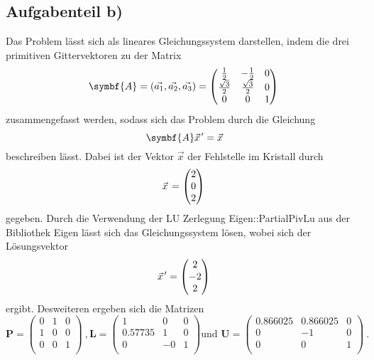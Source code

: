 \subsection*{Aufgabenteil b)}
Das Problem lässt sich als lineares Gleichungssystem darstellen, indem die drei primitiven Gittervektoren zu
der Matrix
\begin{equation}
  \symbf{A}=(\vec{a_1},\vec{a_2},\vec{a_3})=
  \begin{pmatrix}
    \frac{1}{2} & -\frac{1}{2} & 0 \\
    \frac{\sqrt{3}}{2} & \frac{\sqrt{3}}{2} & 0 \\
    0 & 0 & 1 \\
  \end{pmatrix} \\
\end{equation}
zusammengefasst werden, sodass sich das Problem durch die Gleichung
\begin{equation}
  \symbf{A}\pvec{x}'=\vec{x}
\end{equation}
beschreiben lässt.
Dabei ist der Vektor $\vec{x}$ der Fehlstelle im Kristall durch
\begin{equation*}
  \pvec{x}=
  \begin{pmatrix}
    2 \\
    0 \\
    2 \\
  \end{pmatrix} \\
\end{equation*}
gegeben.
Durch die Verwendung der LU Zerlegung Eigen::PartialPivLu aus der Bibliothek Eigen lässt sich das Gleichungssystem lösen, wobei sich der Lösungsvektor
\begin{equation*}
  \pvec{x}'=
  \begin{pmatrix}
    2 \\
    -2 \\
    2 \\
  \end{pmatrix} \\
\end{equation*}
ergibt. Desweiteren ergeben sich die Matrizen
\begin{equation*}
  \symbf{P}=
  \begin{pmatrix}
    0 & 1 & 0 \\
    1 & 0 & 0 \\
    0 & 0 & 1 \\
  \end{pmatrix} \: ,
  \symbf{L}=
  \begin{pmatrix}
    1 & 0 & 0 \\
    0.57735 & 1 & 0 \\
    0 & -0 & 1 \\
  \end{pmatrix}
  \text{und }
  \symbf{U}=
  \begin{pmatrix}
    0.866025 & 0.866025 & 0 \\
    0 & -1 & 0 \\
    0 & 0 & 1 \\
  \end{pmatrix} \: .
\end{equation*}

